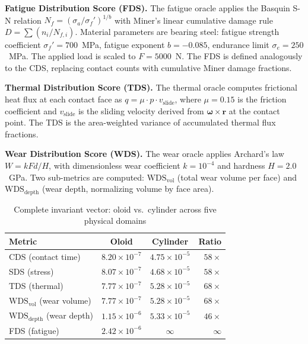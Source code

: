 \documentclass[11pt,a4paper]{article}
\begin{document}
\textbf{Fatigue Distribution Score (FDS).} The fatigue oracle applies the Basquin S-N relation $N_f = (\sigma_a / \sigma_f')^{1/b}$ with Miner's linear cumulative damage rule $D = \sum (n_i / N_{f,i})$. Material parameters are bearing steel: fatigue strength coefficient $\sigma_f' = 700$~MPa, fatigue exponent $b = -0.085$, endurance limit $\sigma_e = 250$~MPa. The applied load is scaled to $F = 5000$~N. The FDS is defined analogously to the CDS, replacing contact counts with cumulative Miner damage fractions.

\textbf{Thermal Distribution Score (TDS).} The thermal oracle computes frictional heat flux at each contact face as $q = \mu \cdot p \cdot v_{\mathrm{slide}}$, where $\mu = 0.15$ is the friction coefficient and $v_{\mathrm{slide}}$ is the sliding velocity derived from $\boldsymbol{\omega} \times \mathbf{r}$ at the contact point. The TDS is the area-weighted variance of accumulated thermal flux fractions.

\textbf{Wear Distribution Score (WDS).} The wear oracle applies Archard's law $W = k F d / H$, with dimensionless wear coefficient $k = 10^{-4}$ and hardness $H = 2.0$~GPa. Two sub-metrics are computed: $\mathrm{WDS}_{\mathrm{vol}}$ (total wear volume per face) and $\mathrm{WDS}_{\mathrm{depth}}$ (wear depth, normalizing volume by face area).

\begin{table}[h]
\centering
\caption{Complete invariant vector: oloid vs.\ cylinder across five physical domains}
\label{tab:invariant-vector}
\begin{tabular}{lccr}
\toprule
Metric & Oloid & Cylinder & Ratio \\
\midrule
CDS (contact time) & $8.20 \times 10^{-7}$ & $4.75 \times 10^{-5}$ & $58\times$ \\
SDS (stress) & $8.07 \times 10^{-7}$ & $4.68 \times 10^{-5}$ & $58\times$ \\
TDS (thermal) & $7.77 \times 10^{-7}$ & $5.28 \times 10^{-5}$ & $68\times$ \\
$\mathrm{WDS}_{\mathrm{vol}}$ (wear volume) & $7.77 \times 10^{-7}$ & $5.28 \times 10^{-5}$ & $68\times$ \\
$\mathrm{WDS}_{\mathrm{depth}}$ (wear depth) & $1.15 \times 10^{-6}$ & $5.33 \times 10^{-5}$ & $46\times$ \\
FDS (fatigue) & $2.42 \times 10^{-6}$ & $\infty$ & $\infty$ \\
\bottomrule
\end{tabular}
\end{table}
\end{document}

